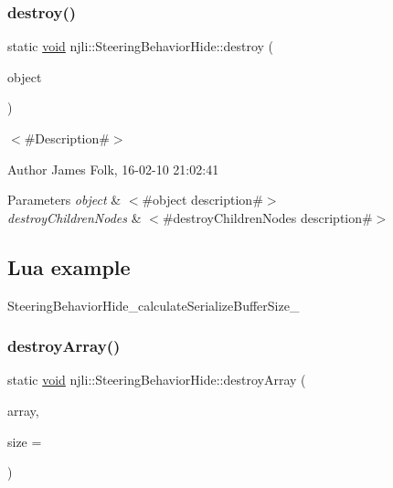 \subsubsection{\texorpdfstring{destroy()}{destroy()}}
{\footnotesize\ttfamily static \mbox{\hyperlink{_thread_8h_af1e856da2e658414cb2456cb6f7ebc66}{void}} njli\+::\+Steering\+Behavior\+Hide\+::destroy (\begin{DoxyParamCaption}\item[{\mbox{\hyperlink{classnjli_1_1_steering_behavior_hide}{Steering\+Behavior\+Hide}} $\ast$}]{object }\end{DoxyParamCaption})\hspace{0.3cm}{\ttfamily [static]}}



$<$\#\+Description\#$>$ 

\begin{DoxyAuthor}{Author}
James Folk, 16-\/02-\/10 21\+:02\+:41
\end{DoxyAuthor}

\begin{DoxyParams}{Parameters}
{\em object} & $<$\#object description\#$>$ \\
\hline
{\em destroy\+Children\+Nodes} & $<$\#destroy\+Children\+Nodes description\#$>$\\
\hline
\end{DoxyParams}
\hypertarget{classnjli_1_1_steering_behavior_wander_ex1}{}\subsection{Lua example}\label{classnjli_1_1_steering_behavior_wander_ex1}

\begin{DoxyCodeInclude}
\end{DoxyCodeInclude}
Steering\+Behavior\+Hide\+\_\+calculate\+Serialize\+Buffer\+Size\+\_\+ \mbox{\label{classnjli_1_1_steering_behavior_hide_a2b539ad0f2fb4f4758c56122f94f16e9}} 
\subsubsection{\texorpdfstring{destroy\+Array()}{destroyArray()}}
{\footnotesize\ttfamily static \mbox{\hyperlink{_thread_8h_af1e856da2e658414cb2456cb6f7ebc66}{void}} njli\+::\+Steering\+Behavior\+Hide\+::destroy\+Array (\begin{DoxyParamCaption}\item[{\mbox{\hyperlink{classnjli_1_1_steering_behavior_hide}{Steering\+Behavior\+Hide}} $\ast$$\ast$}]{array,  }\item[{const \mbox{\hyperlink{_util_8h_a10e94b422ef0c20dcdec20d31a1f5049}{u32}}}]{size = {} }\end{DoxyParamCaption})\hspace{0.3cm}{\ttfamily [static]}}



